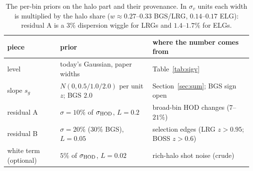 \documentclass[11pt]{article}
\newcommand{\sv}{\sigma_v}
\newcommand{\shod}{\sigma_{\rm HOD}}
\begin{document}
\begin{table}[tbp]
  \centering
  \begin{tabular}{llp{4.5cm}}
    \hline
    piece & prior & where the number comes from \\
    \hline
    level & today's Gaussian, paper widths & Table~\ref{tab:sigv} \\
    slope $s_g$ & $N(0, 0.5/1.0/2.0)$ per unit $z$; BGS $2.0$
      & Section~\ref{sec:sum}; BGS sign open \\
    residual A & $\sigma = 10\%$ of $\shod$, $L = 0.2$
      & broad-bin HOD changes ($7$--$21\%$) \\
    residual B & $\sigma = 20\%$ ($30\%$ BGS), $L = 0.05$
      & selection edges (LRG $z > 0.95$; BOSS $z > 0.6$) \\
    white term (optional) & $5\%$ of $\shod$, $L = 0.02$
      & rich-halo shot noise (crude) \\
    \hline
  \end{tabular}
  \caption{The per-bin priors on the halo part and their provenance.
    In $\sv$ units each width is multiplied by the halo share
    ($w \approx 0.27$--$0.33$ BGS/LRG, $0.14$--$0.17$ ELG): residual
    A is a $3\%$ dispersion wiggle for LRGs and $1.4$--$1.7\%$ for
    ELGs.}
  \label{tab:priors}
\end{table}
\end{document}
